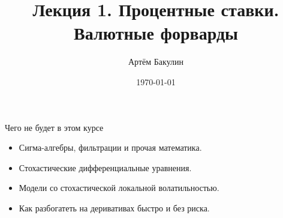\documentclass{beamer}
\title{Лекция 1. Процентные ставки. Валютные форварды}
\author{Артём Бакулин}
\date{\today}
\newcommand{\en}[1]{\begin{otherlanguage}{english}#1\end{otherlanguage}}
\newcommand{\ruen}[2]{#1 (\en{#2})}
\begin{document}
\begin{frame}
\titlepage
\end{frame}



\begin{frame}{Чего не будет в этом курсе}
\begin{itemize}
\justifying
\item Сигма-алгебры, фильтрации и прочая математика.
\item Стохастические дифференциальные уравнения.
\item Модели со стохастической локальной волатильностью.
\item Как разбогатеть на деривативах быстро и без риска.
\end{itemize}
\end{frame}



%




\end{document}
